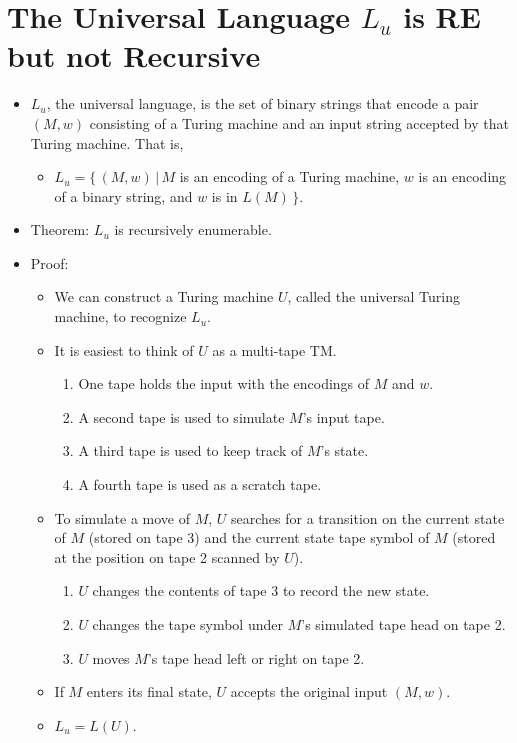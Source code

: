 \documentclass[]{article}
\begin{document}
\section{The Universal Language $L_u$ is RE but not Recursive}
\begin{itemize}
\item $L_u$, the universal language, is the set of binary strings that encode a
pair $(M, w)$ consisting of a Turing machine and an input string accepted by
that Turing machine. That is,
\begin{itemize}
\item $L_u = \{\,(M,w)\,|\,M$ is an encoding of a Turing machine, $w$ is an
encoding of a binary string, and $w$ is in $L(M)\,\}$.
\end{itemize}
\item Theorem: $L_u$ is recursively enumerable.
\item Proof:
\begin{itemize}
\item We can construct a Turing machine $U$, called the universal Turing
machine, to recognize $L_u$.
\item It is easiest to think of $U$ as a multi-tape TM.
\begin{enumerate}
\item One tape holds the input with the encodings of $M$ and $w$.
\item A second tape is used to simulate $M$'s input tape.
\item A third tape is used to keep track of $M$'s state.
\item A fourth tape is used as a scratch tape.
\end{enumerate}
\item To simulate a move of $M$, $U$ searches for a transition on the current
state of $M$ (stored  on tape 3) and the current state tape symbol of $M$
(stored at the position on tape 2 scanned by $U$).
\begin{enumerate}
\item $U$ changes the contents of tape 3 to record the new state.
\item $U$ changes the tape symbol under $M$'s simulated tape head on tape 2.
\item $U$ moves $M$'s tape head left or right on tape 2.
\end{enumerate}
\item If $M$ enters its final state, $U$ accepts the original input $(M, w)$.
\item $L_u = L(U)$.
\end{itemize}

\end{itemize}
\end{document}
